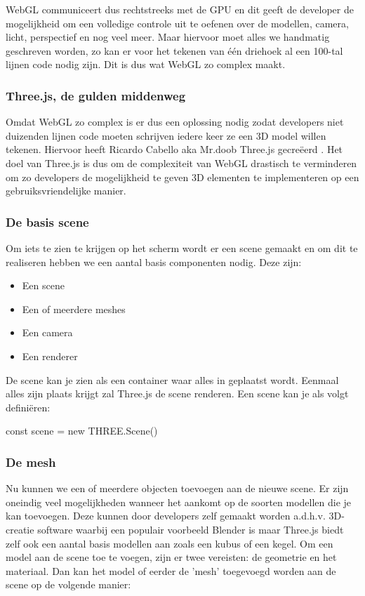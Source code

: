 WebGL communiceert dus rechtstreeks met de GPU en dit geeft de developer de mogelijkheid om een volledige controle uit te oefenen over de modellen, camera, licht, perspectief en nog veel meer. Maar hiervoor moet alles we handmatig geschreven worden, zo kan er voor het tekenen van één driehoek al een 100-tal lijnen code nodig zijn. Dit is dus wat WebGL zo complex maakt.

\subsubsection{Three.js, de gulden middenweg}

Omdat WebGL zo complex is er dus een oplossing nodig zodat developers niet duizenden lijnen code moeten schrijven iedere keer ze een 3D model willen tekenen. Hiervoor heeft Ricardo Cabello aka Mr.doob Three.js gecreëerd \autocite{Danchilla2012}. Het doel van Three.js is dus om de complexiteit van WebGL drastisch te verminderen om zo developers de mogelijkheid te geven 3D elementen te implementeren op een gebruiksvriendelijke manier.

\subsubsection{De basis scene}

Om iets te zien te krijgen op het scherm wordt er een scene gemaakt en om dit te realiseren hebben we een aantal basis componenten nodig. Deze zijn:  

\begin{itemize}
	\item Een scene
	\item Een of meerdere meshes
	\item Een camera
	\item Een renderer
\end{itemize}

De scene kan je zien als een container waar alles in geplaatst wordt. Eenmaal alles zijn plaats krijgt zal Three.js de scene renderen. Een scene kan je als volgt definiëren: 

\begin{LVerbatim}
const scene = new THREE.Scene()
\end{LVerbatim}

\subsubsection{De mesh}

Nu kunnen we een of meerdere objecten toevoegen aan de nieuwe scene. Er zijn oneindig veel mogelijkheden wanneer het aankomt op de soorten modellen die je kan toevoegen. Deze kunnen door developers zelf gemaakt worden a.d.h.v. 3D-creatie software waarbij een populair voorbeeld Blender is maar Three.js biedt zelf ook een aantal basis modellen aan zoals een kubus of een kegel.
Om een model aan de scene toe te voegen, zijn er twee vereisten: de geometrie en het materiaal. Dan kan het model of eerder de 'mesh' toegevoegd worden aan de scene op de volgende manier:

